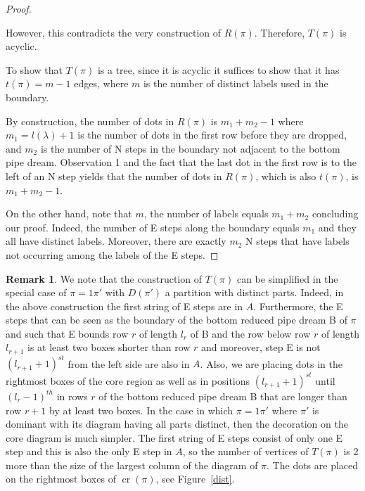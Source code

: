 \documentclass[10pt]{amsart}
\theoremstyle{definition}
\newtheorem{rema}[theo]{Remark}
\numberwithin{equation}{section}
\DeclareMathOperator{\rmcr}{cr}
\newcommand*\+{\smash{\lower2pt\hbox{\rlap{\vrule height14pt}}\raise2pt\hbox{\rlap{\hskip-3pt \vrule height.4pt depth0pt width14.7pt}}}}
\begin{document}
\begin{proof}
\begin{center}
\end{center}
However, this contradicts the very construction of $R(\pi)$. Therefore, $T(\pi)$ is acyclic.

To show that $T(\pi)$ is a tree, since it is acyclic it suffices to show that it has $t(\pi)=m-1$ edges, where $m$ is the number of distinct labels used in the boundary. 

By construction, the number of dots in $R(\pi)$ is $m_1+m_2-1$ where $m_1=l(\lambda)+1$ is the number of dots in the first row before they are dropped, and $m_2$ is the number of N steps in the boundary not adjacent to the bottom pipe dream. {Observation 1} and the fact that the last dot in the first row is to the left of an N step yields that the number of dots in $R(\pi)$, which is also $t(\pi)$, is $m_1+m_2-1$.

On the other hand, note that $m$, the number of labels equals $m_1+m_2$ concluding our proof. Indeed, the number of E steps along the boundary equals $m_1$ and they all have distinct labels. Moreover, there are exactly $m_2$ N steps that have labels not occurring among the labels of the E steps.
\end{proof}

\begin{rema}
We note that the construction of $T(\pi)$ can be simplified in the special case of $\pi=1\pi'$ with $D(\pi')$ a partition with distinct parts. Indeed, in the above construction the first string of E steps are in $A$. Furthermore, the E steps that can be seen as the boundary of the bottom reduced pipe dream B of $\pi$ and such that E bounds row $r$ of length $l_r$ of B and the row below row $r$ of length $l_{r+1}$ is at least two boxes shorter than row $r$ and moreover, step E is not $(l_{r+1}+1)^{st}$ from the left side are also in $A$. Also, we are placing dots in the rightmost boxes of the core region as well as in positions $(l_{r+1}+1)^{st}$ until $(l_r-1)^{th}$ in rows $r$ of the bottom reduced pipe dream B that are longer than row $r+1$ by at least two boxes. In the case in which $\pi=1\pi'$ where $\pi'$ is dominant with its diagram having all parts distinct, then the decoration on the core diagram is much simpler. The first string of E steps consist of only one E step and this is also the only E step in $A$, so the number of vertices of $T(\pi)$ is 2 more than the size of the largest column of the diagram of $\pi$. The dots are placed on the rightmost boxes of $\rmcr(\pi)$, see Figure~\ref{dist}.
\end{rema}
\end{document}
